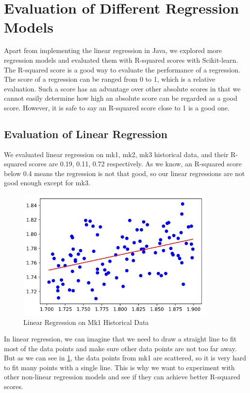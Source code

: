 \documentclass[a4paper]{article}
\begin{document}
\section{Evaluation of Different Regression Models}
Apart from implementing the linear regression in Java, we explored more
regression models and evaluated them with R-squared scores with Scikit-learn.
The R-squared score is a good way to evaluate the performance of a regression.
The score of a regression can be ranged from 0 to 1, which is a relative
evaluation.
Such a score has an advantage over other absolute scores in that we cannot
easily determine how high an absolute score can be regarded as a good score.
However, it is safe to say an R-squared score close to 1 is a good one.

\subsection{Evaluation of Linear Regression}
We evaluated linear regression on mk1, mk2, mk3 historical data, and their
R-squared scores are 0.19, 0.11, 0.72 respectively.
As we know, an R-squared score below 0.4 means the regression is not that good,
so our linear regressions are not good enough except for mk3.

\begin{figure}[H]
  \centering
  \includegraphics[width=10cm]{linear-mk1}
  \caption{Linear Regression on Mk1 Historical Data}%
  \label{fig:linear-mk1}
\end{figure}

In linear regression, we can imagine that we need to draw a straight line to fit
most of the data points and make sure other data points are not too far away.
But as we can see in \cref{fig:linear-mk1}, the data points from mk1 are
scattered, so it is very hard to fit many points with a single line.
This is why we want to experiment with other non-linear regression models and
see if they can achieve better R-squared scores.
\end{document}
